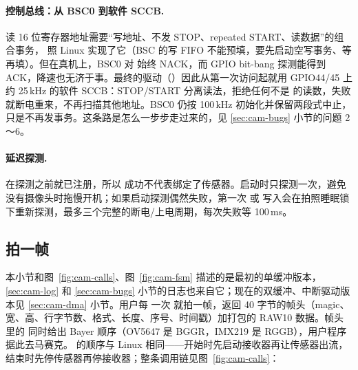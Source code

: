 \paragraph{控制总线：从 BSC0 到软件 SCCB.} 读 16 位寄存器地址需要“写地址、不发 STOP、repeated START、读数据”的组合事务， 照 Linux  实现了它（BSC 的写 FIFO 不能预填，要先启动空写事务、等  再填）。但在真机上，BSC0 对  始终 NACK，而 GPIO bit-bang 探测能得到 ACK，降速也无济于事。最终的驱动（）因此从第一次访问起就用 GPIO44/45 上约 25\,kHz 的软件 SCCB：STOP/START 分离读法，拒绝任何不是  的读数，失败就断电重来，不再扫描其他地址。BSC0 仍按 100\,kHz 初始化并保留两段式中止，只是不再发事务。这条路是怎么一步步走过来的，见 \ref{sec:cam-bugs} 小节的问题 2～6。

\paragraph{延迟探测.}  在探测之前就已注册，所以  成功不代表绑定了传感器。启动时只探测一次，避免没有摄像头时拖慢开机；如果启动探测偶然失败，第一次  或  写入会在拍照睡眠锁  下重新探测，最多三个完整的断电/上电周期，每次失败等 100\,ms。

\subsection{拍一帧}

本小节和图~\ref{fig:cam-calls}、图~\ref{fig:cam-fsm} 描述的是最初的单缓冲版本，\ref{sec:cam-log} 和 \ref{sec:cam-bugs} 小节的日志也来自它；现在的双缓冲、中断驱动版本见 \ref{sec:cam-dma} 小节。用户每  一次  就拍一帧，返回 40 字节的帧头（magic、宽、高、行字节数、格式、长度、序号、时间戳）加打包的 RAW10 数据。帧头里的  同时给出 Bayer 顺序（OV5647 是 BGGR，IMX219 是 RGGB），用户程序据此去马赛克。 的顺序与 Linux 相同——开始时先启动接收器再让传感器出流，结束时先停传感器再停接收器；整条调用链见图~\ref{fig:cam-calls}：

